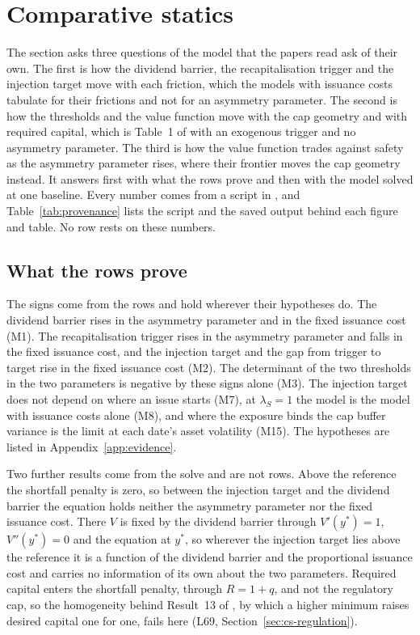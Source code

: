 \section{Comparative statics}
\label{sec:cs}

The section asks three questions of the model that the papers read ask of
their own. The first is how the dividend barrier, the recapitalisation trigger
and the injection target move with each friction, which the models with
issuance costs tabulate for their frictions and not for an asymmetry
parameter. The second is how the thresholds and the value function move with
the cap geometry and with required capital, which is Table~1 of
\citet{bayraktar2026} with an exogenous trigger and no asymmetry parameter.
The third is how the value function trades against safety as the asymmetry
parameter rises, where their frontier moves the cap geometry instead. It
answers first with what the rows prove and then with the model solved at one
baseline. Every number comes from a script in , and
Table~\ref{tab:provenance} lists the script and the saved output behind each
figure and table. No row rests on these numbers.

\subsection{What the rows prove}

The signs come from the rows and hold wherever their hypotheses do. The
dividend barrier rises in the asymmetry parameter and in the fixed issuance
cost (M1). The recapitalisation trigger rises in the asymmetry parameter and
falls in the fixed issuance cost, and the injection target and the gap from
trigger to target rise in the fixed issuance cost (M2). The determinant of the
two thresholds in the two parameters is negative by these signs alone (M3).
The injection target does not depend on where an issue starts (M7), at
$\lambda_S=1$ the model is the model with issuance costs alone (M8), and where
the exposure binds the cap buffer variance is the limit at each date's asset
volatility (M15). The hypotheses are listed in Appendix~\ref{app:evidence}.

Two further results come from the solve and are not rows. Above the reference
the shortfall penalty is zero, so between the injection target and the
dividend barrier the equation holds neither the asymmetry parameter nor the
fixed issuance cost. There $V$ is fixed by the dividend barrier through
$V'(y^*)=1$, $V''(y^*)=0$ and the equation at $y^*$, so wherever the injection
target lies above the reference it is a function of the dividend barrier and
the proportional issuance cost and carries no information of its own about the
two parameters. Required capital enters the shortfall penalty, through
$R=1+q$, and not the regulatory cap, so the homogeneity behind Result~13 of
\citet{milnewhalley2001}, by which a higher minimum raises desired capital one
for one, fails here (L69, Section~\ref{sec:cs-regulation}).

